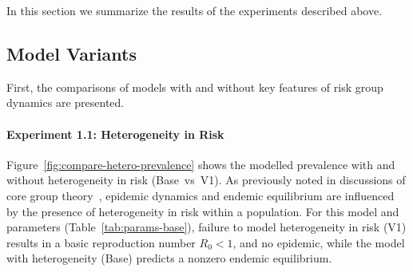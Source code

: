 In this section we summarize the results of the experiments described above.
\subsection{Model Variants}\label{ss:res-variants}
First, the comparisons of models with and without
key features of risk group dynamics are presented.
\paragraph{Experiment 1.1: Heterogeneity in Risk}\label{p:res-1-hetero}
Figure~\ref{fig:compare-hetero-prevalence} shows the modelled prevalence
with and without heterogeneity in risk (Base~vs~V1).
As previously noted in discussions of core group theory~\citep{Yorke1978,Stigum1994},
epidemic dynamics and endemic equilibrium are influenced by the presence of
heterogeneity in risk within a population.
For this model and parameters (Table~\ref{tab:params-base}),
failure to model heterogeneity in risk (V1) results in
a basic reproduction number $R_0 < 1$, and no epidemic,
while the model with heterogeneity (Base) predicts a nonzero endemic equilibrium.
